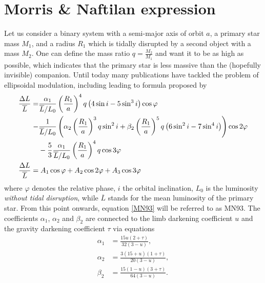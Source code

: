 \documentclass{pracalicmgr}
\begin{document}
\section{Morris \& Naftilan expression}
Let us consider a binary system with a semi-major axis of orbit $a$, a primary star mass $M_1$, and a radius $R_1$ which is tidally disrupted by a second object with a mass $M_2$.
One can define the mass ratio $q=\frac{M_2}{M_1}$ and want it to be as high as possible, which indicates that the primary star
is less massive than the (hopefully invisible) companion. 
Until today many publications have tackled the problem of ellipsoidal modulation, including \citet{kopal_close_1959} leading to formula proposed by \citet{morris_equations_1993}
\begin{align}\label{MN93}
    \begin{split}
    \phantom{\frac{\Delta{L}}{\overline{L}}}
    &\begin{aligned}
        \mathllap{\frac{\Delta{L}}{\overline{L}}}  =& \frac{\alpha_1}{\overline{L}/L_0}\left(\frac{R_1}{a}\right)^4q\left(4\sin{i}-5\sin^3{i}\right)\cos{\varphi} \\
        -&\frac{1}{\overline{L}/L_0}\left(\alpha_2\left(\frac{R_1}{a}\right)^3q\sin^2{i}+\beta_2 
        \left(\frac{R_1}{a}\right)^5q\left(6\sin^2{i}-7\sin^4{i}\right)\right)\cos{2\varphi} \\
        &-\frac{5}{3}\frac{\alpha_1}{\overline{L}/L_0}\left(\frac{R_1}{a}\right)^4q\cos{3\varphi}
    \end{aligned}\\
    &\begin{aligned}
        \mathllap{\frac{\Delta{L}}{\overline{L}}}   &= A_1\cos{\varphi}+A_2\cos{2\varphi}+A_3\cos{3\varphi}
    \end{aligned}
    \end{split}
\end{align}
where $\varphi$ denotes the relative phase, $i$ the orbital inclination, $L_0$ is the luminosity {{\it without tidal disruption}},
while $\overline{L}$ stands for the mean luminosity of the primary star. From this point onwards, equation \ref{MN93} will be referred to as MN93.
The coefficients $\alpha_1$, $\alpha_2$ and
$\beta_2$ are connected to the limb darkening coefficient $u$ and the gravity darkening coefficient $\tau$ via equations
\begin{align}
    \alpha_1 &=\frac{15u(2+\tau)}{32(3-u)},\\
    \alpha_2 &=\frac{3(15+u)(1+\tau)}{20(3-u)},\\
    \beta_2 &=\frac{15(1-u)(3+\tau)}{64(3-u)}.
\end{align}
\end{document}
